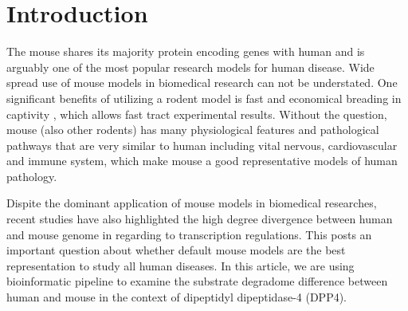 \section{Introduction}

The mouse shares its majority protein encoding genes with human and is arguably one of the most popular research models for human disease. Wide spread use of mouse models in biomedical research can not be understated. \cite{MORSEIII_2007} One significant benefits of utilizing a rodent model is fast and economical breading in captivity \cite{Rosenthal_2007}, which allows fast tract experimental results. \cite{Vandamme_2014} Without the question, mouse (also other rodents) has many physiological features and pathological pathways that are very similar to human including vital nervous, cardiovascular and immune system, which make mouse a good representative models of human pathology. \cite{MORSEIII_2007,Rosenthal_2007}

Dispite the dominant application of mouse models in biomedical researches, recent studies have also highlighted the high degree divergence between human and mouse genome in regarding to transcription regulations. \cite{25409824} This posts an important question about whether default mouse models are the best representation to study all human diseases. In this article, we are using bioinformatic pipeline to examine the substrate degradome difference between human and mouse in the context of dipeptidyl dipeptidase-4 (DPP4).  


\cite{Justice_2011}